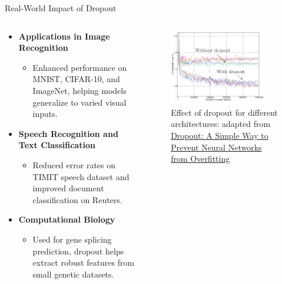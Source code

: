 \documentclass[serif, aspectratio=169]{beamer}
\begin{document}
\begin{frame}{Real-World Impact of Dropout}
\begin{columns}
    
        \begin{column}{0.5\textwidth}
    \begin{itemize}
        \item \textbf{Applications in Image Recognition}
            \begin{itemize}
                \item Enhanced performance on MNIST, CIFAR-10, and ImageNet, helping models generalize to varied visual inputs.
            \end{itemize}
        \item \textbf{Speech Recognition and Text Classification}
            \begin{itemize}
                \item Reduced error rates on TIMIT speech dataset and improved document classification on Reuters.
            \end{itemize}
        \item \textbf{Computational Biology}
            \begin{itemize}
                \item Used for gene splicing prediction, dropout helps extract robust features from small genetic datasets.
            \end{itemize}
    \end{itemize}
    \end{column}
    \begin{column}{0.5\textwidth}
            \begin{figure}
                \includegraphics[width=0.9\textwidth]{pic/dropout/effect-of-dropout.png}
                \caption{Effect of dropout for different architectures: adapted from \href{https://jmlr.org/papers/v15/srivastava14a.html}{Dropout: A Simple Way to Prevent Neural Networks from Overfitting}}
                \label{fig:Dropout}
            \end{figure}
        \end{column}
\end{columns}
\end{frame}
\end{document}

